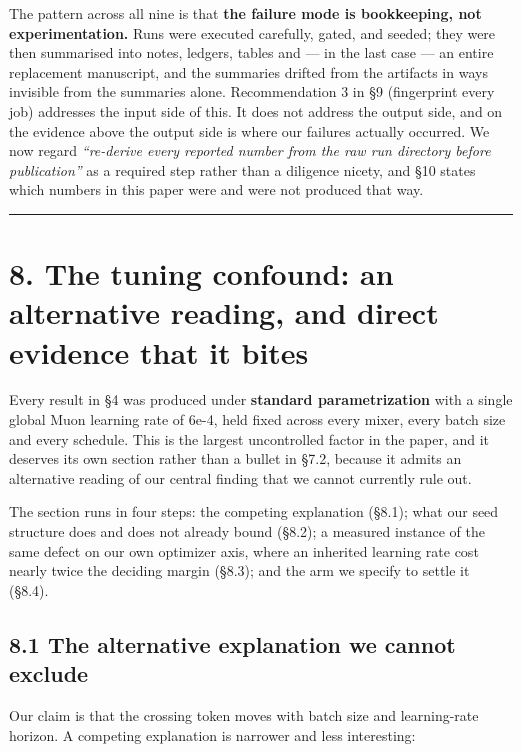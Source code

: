 The pattern across all nine is that \textbf{the failure mode is bookkeeping, not experimentation.} Runs
were executed carefully, gated, and seeded; they were then summarised into notes, ledgers, tables
and --- in the last case --- an entire replacement manuscript, and the summaries drifted from the
artifacts in ways invisible from the summaries alone. Recommendation 3 in \S9 (fingerprint every
job) addresses the input side of this. It does not address the output side, and on the evidence
above the output side is where our failures actually occurred. We now regard \emph{``re-derive every
reported number from the raw run directory before publication''} as a required step rather than a
diligence nicety, and \S10 states which numbers in this paper were and were not produced that way.

\begin{center}\rule{0.5\linewidth}{0.5pt}\end{center}

\section{8. The tuning confound: an alternative reading, and direct evidence that it bites}\label{the-tuning-confound-an-alternative-reading-and-direct-evidence-that-it-bites}

Every result in \S4 was produced under \textbf{standard parametrization} with a single global Muon
learning rate of 6e-4, held fixed across every mixer, every batch size and every schedule. This is
the largest uncontrolled factor in the paper, and it deserves its own section rather than a bullet
in \S7.2, because it admits an alternative reading of our central finding that we cannot currently
rule out.

The section runs in four steps: the competing explanation (\S8.1); what our seed structure does and
does not already bound (\S8.2); a measured instance of the same defect on our own optimizer axis,
where an inherited learning rate cost nearly twice the deciding margin (\S8.3); and the arm we
specify to settle it (\S8.4).

\subsection{8.1 The alternative explanation we cannot exclude}\label{the-alternative-explanation-we-cannot-exclude}

Our claim is that the crossing token moves with batch size and learning-rate horizon. A competing
explanation is narrower and less interesting:

